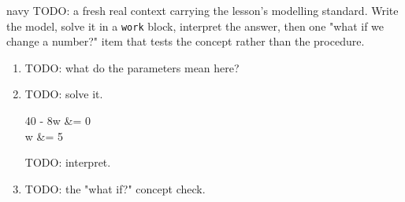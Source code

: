 \documentclass[10pt]{article}
\begin{document}
\boxguard[22]
\begin{scenariobox}{navy}
TODO: a fresh real context carrying the lesson's modelling standard. Write the model, solve it in a
\texttt{work} block, interpret the answer, then one "what if we change a number?" item that tests
the concept rather than the procedure.
\begin{enumerate}[label=\textbf{\alph*.}, leftmargin=1.8em, itemsep=5pt]
  \item TODO: what do the parameters mean here? 
  \item TODO: solve it.
    \begin{work}
      40 - 8w &= 0 \\
            w &= 5
    \end{work}
    TODO: interpret. 
  \item TODO: the "what if?" concept check. 
\end{enumerate}
\end{scenariobox}
\end{document}
